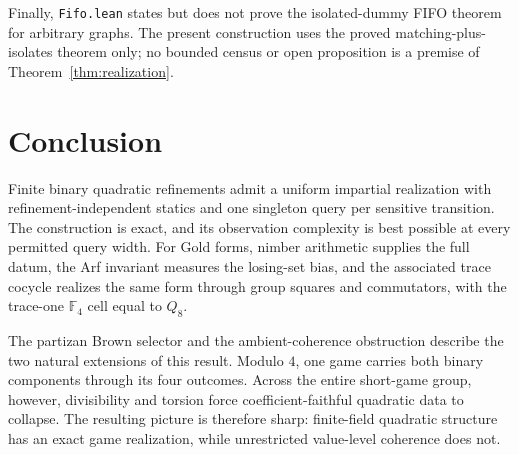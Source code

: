 \documentclass[11pt]{article}
\theoremstyle{definition}
\theoremstyle{remark}
\newcommand{\F}{\mathbb{F}}
\begin{document}
Finally, \texttt{Fifo.lean} states but does not prove the isolated-dummy FIFO
theorem for arbitrary graphs.  The present construction uses the proved
matching-plus-isolates theorem only; no bounded census or open proposition is
a premise of Theorem~\ref{thm:realization}.

\section{Conclusion}

Finite binary quadratic refinements admit a uniform impartial realization
with refinement-independent statics and one singleton query per sensitive
transition.  The construction is exact, and its observation complexity is
best possible at every permitted query width.  For Gold forms, nimber
arithmetic supplies the full datum, the Arf invariant measures the losing-set
bias, and the associated trace cocycle realizes the same form through group
squares and commutators, with the trace-one $\F_4$ cell equal to $Q_8$.

The partizan Brown selector and the ambient-coherence obstruction describe
the two natural extensions of this result.  Modulo $4$, one game carries both
binary components through its four outcomes.  Across the entire short-game
group, however, divisibility and torsion force coefficient-faithful quadratic
data to collapse.  The resulting picture is therefore sharp: finite-field
quadratic structure has an exact game realization, while unrestricted
value-level coherence does not.

\small


\end{document}
